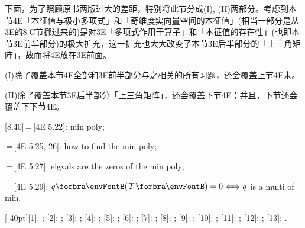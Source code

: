
\vspace{2pt}

\footnotesize
下面，为了照顾原书两版过大的差距，特别将此节分成(I), (II)两部分。考虑到本节4E「本征值与极小多项式」和「奇维度实向量空间的本征值」(相当一部分是从3E的8.C节挪过来的)是对3E「多项式作用于算子」和「本征值的存在性」(也即本节3E前半部分)的极大扩充，这一扩充也大大改变了本节3E后半部分的「上三角矩阵」，故而将4E放在3E前面。\par
(I)除了覆盖本节4E全部和3E前半部分与之相关的所有习题，还会覆盖上节4E末。\par
(II)除了覆盖本节3E后半部分「上三角矩阵」，还会覆盖下节4E；并且，下节还会覆盖下下节4E。\par\vspace{2pt}
\small
[8.40]\,=\,[4E 5.22]: min poly;\par
[8.44, 45]\,=\,[4E 5.25, 26]: how to find the min poly;\par
[8.49]\,=\,[4E 5.27]: eigvals are the zeros of the min poly;\par
[8.46]\,=\,[4E 5.29]: $q\Par{T} = 0\Longleftrightarrow q$ is a multi of min.\par

\large

[-40pt]{[1]: ; [2]: ; [3]: ; [4]: ; [5]: ; [6]: ; [7]: ; [8]: ; [9]: ; [10]: ; [11]: ; [12]: ; [13]: .}


